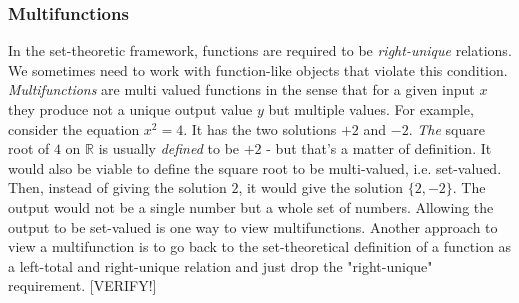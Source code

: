 



\subsubsection{Multifunctions}
In the set-theoretic framework, functions are required to be \emph{right-unique} relations. We sometimes need to work with function-like objects that violate this condition. \emph{Multifunctions} are multi valued functions in the sense that for a given input $x$ they produce not a unique output value $y$ but multiple values. For example, consider the equation $x^2 = 4$. It has the two solutions $+2$ and $-2$. \emph{The} square root of $4$ on $\mathbb{R}$ is usually \emph{defined} to be $+2$ - but that's a matter of definition. It would also be viable to define the square root to be multi-valued, i.e. set-valued. Then, instead of giving the solution $2$, it would give the solution $\{2,-2\}$. The output would not be a single number but a whole set of numbers. Allowing the output to be set-valued is one way to view multifunctions. Another approach to view a multifunction is to go back to the set-theoretical definition of a function as a left-total and right-unique relation and just drop the "right-unique" requirement. [VERIFY!]



